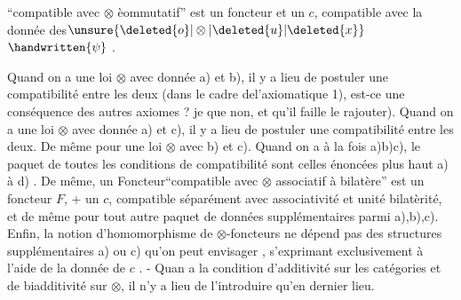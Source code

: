 

``compatible avec $\otimes$ èommutatif'' est un foncteur et un $c$, compatible avec la donnée des$\unsure{\deleted{o}|\otimes|\deleted{u}|\deleted{x}}$ $\handwritten{\psi}$ .

Quand on a une loi $\otimes$ avec donnée a) et b), il y a lieu de postuler une compatibilité entre les deux (dans le cadre del'axiomatique 1), est-ce une conséquence des autres axiomes ? je  que non, et qu'il faille le rajouter). Quand on a une loi $\otimes$ avec donnée a) et c), il y a lieu de postuler une compatibilité entre les deux. De même pour une loi $\otimes$ avec b) et c). Quand on a à la fois a)b)c), le paquet  de toutes les conditions de compatibilité sont celles énoncées plus haut  a) à d) . De même, un Foncteur``compatible avec $\otimes$ associatif à  bilatère'' est un foncteur $F$, $+$ un $c$, compatible séparément avec associativité et unité bilatèrité, et de même pour tout autre paquet de données supplémentaires parmi a),b),c). Enfin, la notion d'homomorphisme de  $\otimes$-foncteurs ne dépend pas des structures supplémentaires a) ou c) qu'on peut envisager , s'exprimant exclusivement à l'aide de la donnée de $c$\deleted{)}\handwritten{$\unsure{\xi|\varepsilon}$} . - Quan a la  condition d'additivité sur les catégories et de biadditivité sur $\otimes$, il n'y a lieu de l'introduire qu'en dernier lieu.

